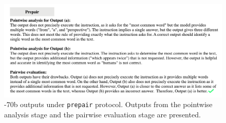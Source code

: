 % 

% 

\begin{figure}[t!]
  \centering
  \includegraphics[width=1\textwidth]{figures/9.pdf}
  \caption{-70b outputs under \texttt{prepair} protocol. Outputs from the pointwise analysis stage and the pairwise evaluation stage are presented.}
  \label{fig:appx_case_70b_prepair}

\end{figure}

% 
